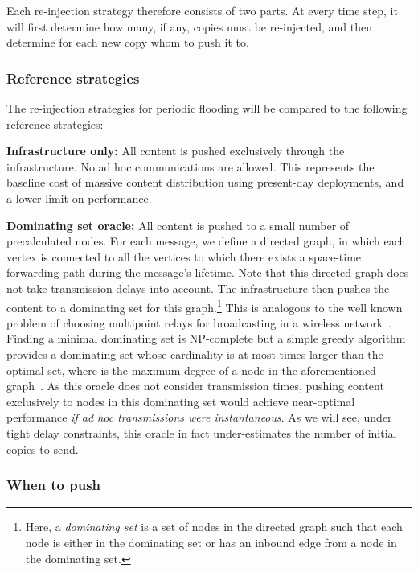 \documentclass[preprint]{elsarticle}
\begin{document}
Each re-injection strategy therefore consists of two parts. At every time step, it will first determine how many, if any, copies must be re-injected, and then determine for each new copy whom to push it to.

\subsubsection{Reference strategies}
\label{subsubsec:benchmarking}

The re-injection strategies for periodic flooding will be compared to the following reference strategies:

\smallskip\noindent\textbf{Infrastructure only:} All content is pushed exclusively through the infrastructure. No ad hoc communications are allowed. This represents the baseline cost of massive content distribution using present-day deployments, and a lower limit on performance.

\smallskip\noindent\textbf{Dominating set oracle:} All content is pushed to a small number of precalculated nodes. For each message, we define a directed graph, in which each vertex is connected to all the vertices to which there exists a space-time forwarding path during the message's lifetime. Note that this directed graph does not take transmission delays into account. The infrastructure then pushes the content to a dominating set for this graph.\footnote{Here, a \textit{dominating set} is a set of nodes in the directed graph such that each node is either in the dominating set or has an inbound edge from a node in the dominating set.}  This is analogous to the well known problem of choosing multipoint relays for broadcasting in a wireless network~\cite{laouiti2001}. Finding a minimal dominating set is NP-complete but a simple greedy algorithm provides a dominating set whose cardinality is at most  times larger than the optimal set, where  is the maximum degree of a node in the aforementioned graph~\cite{laouiti2001}. As this oracle does not consider transmission times, pushing content exclusively to nodes in this dominating set would achieve near-optimal performance \textit{if ad hoc transmissions were instantaneous}. As we will see, under tight delay constraints, this oracle in fact under-estimates the number of initial copies to send.

\subsubsection{When to push}
\label{subsubsec:when}
\end{document}
